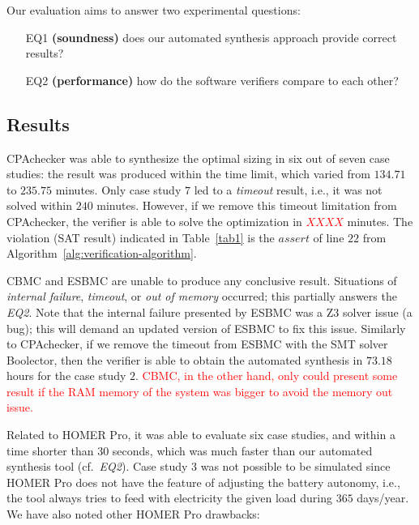 \documentclass[review]{elsarticle}
\begin{document}
Our evaluation aims to answer two experimental questions: 

\begin{enumerate}

\item[EQ1] \textbf{(soundness)} does our automated synthesis approach provide correct results?

\item[EQ2] \textbf{(performance)} how do the software verifiers compare to each other?

\end{enumerate}

\subsection{Results}  

CPAchecker was able to synthesize the optimal sizing in six 
out of seven case studies: the result was produced within 
the time limit, which varied from $134.71$ to $235.75$ minutes. 
Only case study $7$ led to a \textit{timeout} result, i.e., 
it was not solved within $240$ minutes. However, if we remove 
this timeout limitation from CPAchecker, the verifier is 
able to solve the optimization in \textcolor{red}{$XXXX$} minutes. 
The violation (SAT result) indicated in Table~\ref{tab1} 
is the $assert$ of line $22$ from Algorithm~\ref{alg:verification-algorithm}. %

CBMC and ESBMC are unable to produce any conclusive result. 
Situations of \textit{internal failure}, \textit{timeout}, 
or \textit{out of memory} occurred; this partially answers 
the \textit{EQ2}. Note that the internal failure presented 
by ESBMC was a Z3 solver issue (a bug); this will demand 
an updated version of ESBMC to fix this issue. Similarly to CPAchecker, 
if we remove the timeout from ESBMC with the SMT solver Boolector, 
then the verifier is able to obtain the automated synthesis 
in $73.18$ hours for the case study $2$. \textcolor{red}{CBMC, in the other hand, only could present some result if the RAM memory of the system was bigger to avoid the memory out issue.}

Related to HOMER Pro, it was able to evaluate six case studies, 
and within a time shorter than $30$ seconds, which was much 
faster than our automated synthesis tool (cf.~\textit{EQ2}). 
Case study $3$ was not possible to be simulated since HOMER Pro 
does not have the feature of adjusting the battery autonomy, i.e., 
the tool always tries to feed with electricity the given load 
during $365$ days/year. We have also noted other HOMER Pro drawbacks:
\end{document}

